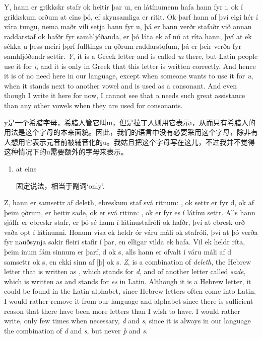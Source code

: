 \begin{paracol}{2}
  Y, hann er grikkskr stafr ok heitir þar uı, en látínumenn hafa hann fyr ı, ok í grikkskum orðum at eins þó, ef skynsamliga er ritit. Ok þarf hann af því eigi hér í vára tungu, nema maðr vili setja hann fyr u, þá er hann verðr stafaðr við annan raddarstaf ok hafðr fyr samhljóðanda, er þó láta ek af nú at ríta hann, því at ek sékka u þess meiri þǫrf fulltings en ǫðrum raddarstǫfum, þá er þeir verða fyr samhljóðendr settir.
  \switchcolumn
  \textit{Y}, it is a Greek letter and is called \textit{uı} there, but Latin people use it for \textit{ı}, and it is only in Greek that this letter is written correctly. And hence it is of no need here in our language, except when someone wants to use it for \textit{u}, when it stands next to another vowel and is used as a consonant. And even though I write it here for now, I cannot see that \textit{u} needs such great assistance than any other vowels when they are used for consonants.
\end{paracol}
\begin{translation*}{}
  y是一个希腊字母，希腊人管它叫uı，但是拉丁人则用它表示ı，从而只有希腊人的用法是这个字母的本来面貌。因此，我们的语言中没有必要采用这个字母，除非有人想用它表示元音前被辅音化的u。我姑且把这个字母写在这儿，不过我并不觉得这种情况下的u需要额外的字母来表示。
\end{translation*}
\begin{grammar*}{}
  \begin{enumerate}[leftmargin=*]
    \item at eins

          固定说法，相当于副词`only'.
  \end{enumerate}
\end{grammar*}
\begin{paracol}{2}
  Z, hann er samsettr af deleth, ebreskum staf svá ritnum: , ok settr er fyr d, ok af þeim ǫðrum, er heitir sade, ok er svá ritinn: , ok er fyr es í látínu settr. Alls hann sjálfr er ebreskr stafr, er þó sé hann í látínustafrófi ok hafðr, því at ebresk orð vaða opt í látínunni. Honum vísa ek heldr ór váru máli ok stafrófi, því at þó verða fyr nauðsynja sakir fleiri stafir í þar, en elligar vilda ek hafa. Vil ek heldr ríta, þeim inum fám sinnum er þarf, d ok s, alls hann er ofvalt í váru máli af d samsettr ok s, en ekki sinn af [þ] ok s.
  \switchcolumn
  \textit{Z}, is a combination of \textit{deleth}, the Hebrew letter that is written as , which stands for \textit{d}, and of another letter called \textit{sade}, which is written as  and stands for \textit{es} in Latin. Although it is a Hebrew letter, it could be found in the Latin alphabet, since Hebrew letters often come into Latin. I would rather remove it from our language and alphabet since there is sufficient reason that there have been more letters than I wish to have. I would rather write, only few times when necessary, \textit{d} and \textit{s}, since it is always in our language the combination of \textit{d} and \textit{s}, but never \textit{þ} and \textit{s}.
\end{paracol}
